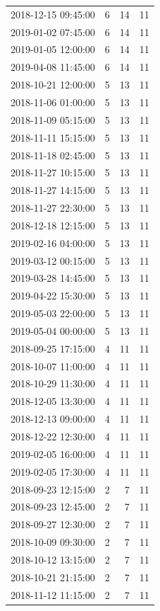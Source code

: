 \begin{tabular}{lrrr}
2018-12-15 09:45:00 & 6 & 14 & 11 \\
2019-01-02 07:45:00 & 6 & 14 & 11 \\
2019-01-05 12:00:00 & 6 & 14 & 11 \\
2019-04-08 11:45:00 & 6 & 14 & 11 \\
2018-10-21 12:00:00 & 5 & 13 & 11 \\
2018-11-06 01:00:00 & 5 & 13 & 11 \\
2018-11-09 05:15:00 & 5 & 13 & 11 \\
2018-11-11 15:15:00 & 5 & 13 & 11 \\
2018-11-18 02:45:00 & 5 & 13 & 11 \\
2018-11-27 10:15:00 & 5 & 13 & 11 \\
2018-11-27 14:15:00 & 5 & 13 & 11 \\
2018-11-27 22:30:00 & 5 & 13 & 11 \\
2018-12-18 12:15:00 & 5 & 13 & 11 \\
2019-02-16 04:00:00 & 5 & 13 & 11 \\
2019-03-12 00:15:00 & 5 & 13 & 11 \\
2019-03-28 14:45:00 & 5 & 13 & 11 \\
2019-04-22 15:30:00 & 5 & 13 & 11 \\
2019-05-03 22:00:00 & 5 & 13 & 11 \\
2019-05-04 00:00:00 & 5 & 13 & 11 \\
2018-09-25 17:15:00 & 4 & 11 & 11 \\
2018-10-07 11:00:00 & 4 & 11 & 11 \\
2018-10-29 11:30:00 & 4 & 11 & 11 \\
2018-12-05 13:30:00 & 4 & 11 & 11 \\
2018-12-13 09:00:00 & 4 & 11 & 11 \\
2018-12-22 12:30:00 & 4 & 11 & 11 \\
2019-02-05 16:00:00 & 4 & 11 & 11 \\
2019-02-05 17:30:00 & 4 & 11 & 11 \\
2018-09-23 12:15:00 & 2 & 7 & 11 \\
2018-09-23 12:45:00 & 2 & 7 & 11 \\
2018-09-27 12:30:00 & 2 & 7 & 11 \\
2018-10-09 09:30:00 & 2 & 7 & 11 \\
2018-10-12 13:15:00 & 2 & 7 & 11 \\
2018-10-21 21:15:00 & 2 & 7 & 11 \\
2018-11-12 11:15:00 & 2 & 7 & 11 \\

\end{tabular}
